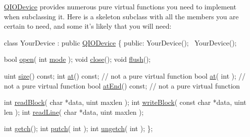 \hyperlink{class_q_i_o_device}{Q\-I\-O\-Device} provides numerous pure virtual functions you need to implement when subclassing it. Here is a skeleton subclass with all the members you are certain to need, and some it's likely that you will need\-:


\begin{DoxyCode}
\textcolor{keyword}{class }YourDevice : \textcolor{keyword}{public} \hyperlink{class_q_i_o_device}{QIODevice}
\{
\textcolor{keyword}{public}:
YourDevice();
   ~YourDevice();

\textcolor{keywordtype}{bool} \hyperlink{class_q_i_o_device_ab12465ab61dfc4e6de94a9b039d00759}{open}( \textcolor{keywordtype}{int} \hyperlink{class_q_i_o_device_a649d73845b061693fc34041ba743191c}{mode} );
\textcolor{keywordtype}{void} \hyperlink{class_q_i_o_device_a99e62b97d3c24562d2dd84c47fab6b06}{close}();
\textcolor{keywordtype}{void} \hyperlink{class_q_i_o_device_a4d70e7cca08ae728d486c63f4804e63b}{flush}();

uint \hyperlink{class_q_i_o_device_add26671f6640db9316df9922fef40b38}{size}() \textcolor{keyword}{const};
\textcolor{keywordtype}{int}  \hyperlink{class_q_i_o_device_a3bce8d0bb4d6fbaa012b9a61c3910907}{at}() \textcolor{keyword}{const};  \textcolor{comment}{// not a pure virtual function}
\textcolor{keywordtype}{bool} \hyperlink{class_q_i_o_device_a3bce8d0bb4d6fbaa012b9a61c3910907}{at}( \textcolor{keywordtype}{int} );       \textcolor{comment}{// not a pure virtual function}
\textcolor{keywordtype}{bool} \hyperlink{class_q_i_o_device_a11cbf4ba82ee565cb9eef28b972bf145}{atEnd}() \textcolor{keyword}{const};   \textcolor{comment}{// not a pure virtual function}

\textcolor{keywordtype}{int} \hyperlink{class_q_i_o_device_ac0c97a10369456c0942192a14f11c188}{readBlock}( \textcolor{keywordtype}{char} *data, uint maxlen );
\textcolor{keywordtype}{int} \hyperlink{class_q_i_o_device_a90a5a6111eca9a444970cf49aea9f9a8}{writeBlock}( \textcolor{keyword}{const} \textcolor{keywordtype}{char} *data, uint len );
\textcolor{keywordtype}{int} \hyperlink{class_q_i_o_device_aa360b2281966b05ff25504cf03046c90}{readLine}( \textcolor{keywordtype}{char} *data, uint maxlen );

\textcolor{keywordtype}{int} \hyperlink{class_q_i_o_device_a8fcd2eaee3ba67c6029f9e3e835bb7b1}{getch}();
\textcolor{keywordtype}{int} \hyperlink{class_q_i_o_device_a97247e4849c3038bde0e115215f5b995}{putch}( \textcolor{keywordtype}{int} );
\textcolor{keywordtype}{int} \hyperlink{class_q_i_o_device_a8a5c37807d314cc04d65f1d0825c6e31}{ungetch}( \textcolor{keywordtype}{int} );
\};
\end{DoxyCode}


